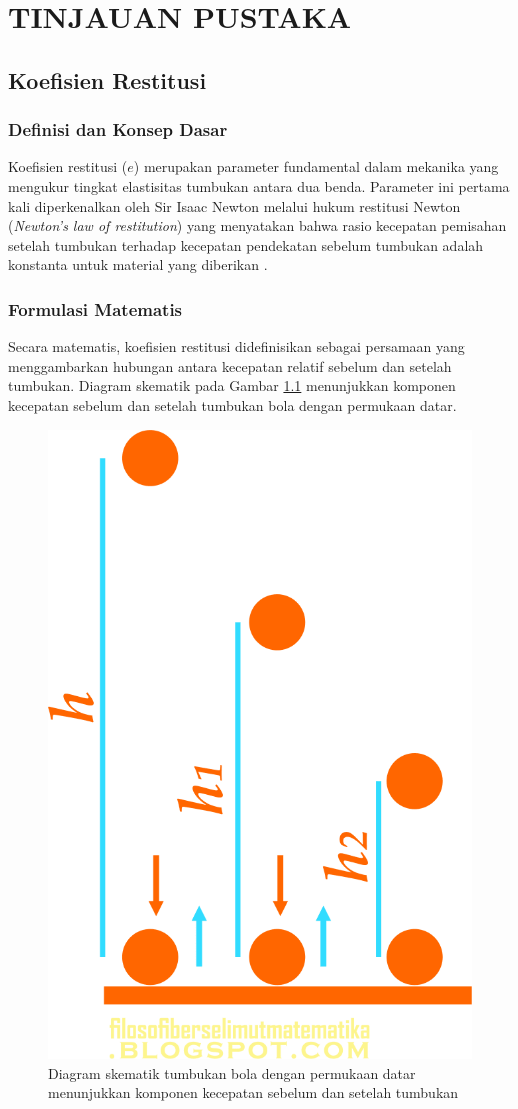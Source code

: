 \chapter{TINJAUAN PUSTAKA}

\section{Koefisien Restitusi}

\subsection{Definisi dan Konsep Dasar}
Koefisien restitusi ($e$) merupakan parameter fundamental dalam mekanika yang mengukur tingkat elastisitas tumbukan antara dua benda. Parameter ini pertama kali diperkenalkan oleh Sir Isaac Newton melalui hukum restitusi Newton (\textit{Newton's law of restitution}) yang menyatakan bahwa rasio kecepatan pemisahan setelah tumbukan terhadap kecepatan pendekatan sebelum tumbukan adalah konstanta untuk material yang diberikan \citep{goldsmith1999theory}.

\subsection{Formulasi Matematis}
Secara matematis, koefisien restitusi didefinisikan sebagai persamaan yang menggambarkan hubungan antara kecepatan relatif sebelum dan setelah tumbukan. Diagram skematik pada Gambar \ref{fig:teori-figure-1} menunjukkan komponen kecepatan sebelum dan setelah tumbukan bola dengan permukaan datar.

\begin{figure}
    \centering
    \includegraphics[width=0.3\linewidth]{images/gambar restitusi.png}
    \caption{Diagram skematik tumbukan bola dengan permukaan datar menunjukkan komponen kecepatan sebelum dan setelah tumbukan}
    \label{fig:teori-figure-1}
\end{figure}

